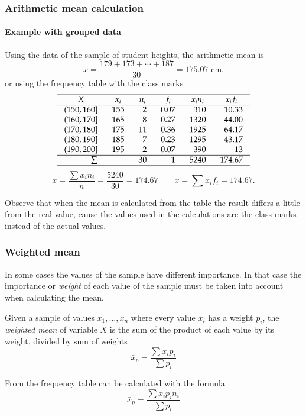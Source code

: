 \begin{frame}
\frametitle{Arithmetic mean calculation}
\framesubtitle{Example with grouped data}
Using the data of the sample of student heights, the arithmetic mean is 
\[
\bar{x} = \frac{179+173+\cdots+187}{30} = 175.07 \mbox{ cm}.
\]
or using the frequency table with the class marks 
\[
\setlength\arraycolsep{3mm}
\setlength\arrayrulewidth{0.5pt}
\begin{array}{rrrrrr}
\hline
\multicolumn{1}{c}{X} & \multicolumn{1}{c}{x_i} & \multicolumn{1}{c}{n_i} & \multicolumn{1}{c}{f_i} & \multicolumn{1}{c}{x_in_i} & \multicolumn{1}{c}{x_if_i}\\
\hline
(150,160] & 155 & 2 & 0.07 & 310 & 10.33\\
(160,170] & 165 & 8 & 0.27 & 1320 & 44.00\\
(170,180] & 175 & 11 & 0.36 & 1925 & 64.17\\
(180,190] & 185 & 7 & 0.23 & 1295 & 43.17\\
(190,200] & 195 & 2 & 0.07 & 390 & 13 \\
\hline
\sum &  & 30 & 1 & 5240 & 174.67 \\
\hline
\end{array}
\]
\[
\bar{x} = \frac{\sum x_in_i}{n} = \frac{5240}{30}= 174.67 \qquad \bar{x}=\sum{x_if_i} = 174.67.
\]

Observe that when the mean is calculated from the table the result differs a little from the real value, cause the
values used in the calculations are the class marks instead of the actual values.
\end{frame}


\begin{frame}
\frametitle{Weighted mean}
In some cases the values of the sample have different importance. 
In that case the importance or \emph{weight} of each value of the sample must be taken into account when calculating
the mean. 

\begin{definition}
Given a sample of values $x_1,\ldots,x_n$ where every value $x_i$ has a weight $p_i$, the \emph{weighted
mean} of variable $X$ is the sum of the product of each value by its weight, divided by sum of weights
\[
\bar{x}_p = \frac{\sum x_ip_i}{\sum p_i}
\]
\end{definition}

From the frequency table can be calculated with the formula
\[
\bar{x}_p = \frac{\sum x_ip_in_i}{\sum p_i}
\]
\end{frame}


